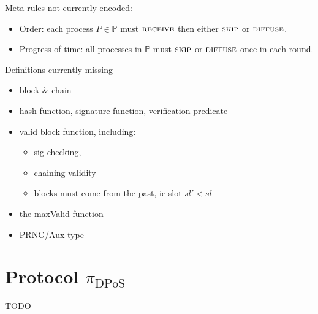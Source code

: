 \documentclass{article}
\begin{document}
\bigskip

Meta-rules not currently encoded:
\begin{itemize}
\item Order: each process $P \in \mathbb{P}$ must $\textsc{receive}$ then
either $\textsc{skip}$ or $\textsc{diffuse}$.
\item Progress of time: all processes in $\mathbb{P}$ must $\textsc{skip}$ or $\textsc{diffuse}$
once in each round.
\end{itemize}

Definitions currently missing
\begin{itemize}
\item block \& chain
\item hash function, signature function, verification predicate
\item valid block function, including:
      \begin{itemize}
      \item sig checking,
      \item chaining validity
      \item blocks must come from the past, ie slot $sl' < sl$
      \end{itemize}
\item the maxValid function
\item PRNG/Aux type
\end{itemize}


\section{Protocol $\pi_{\text{DPoS}}$}

TODO



\end{document}
